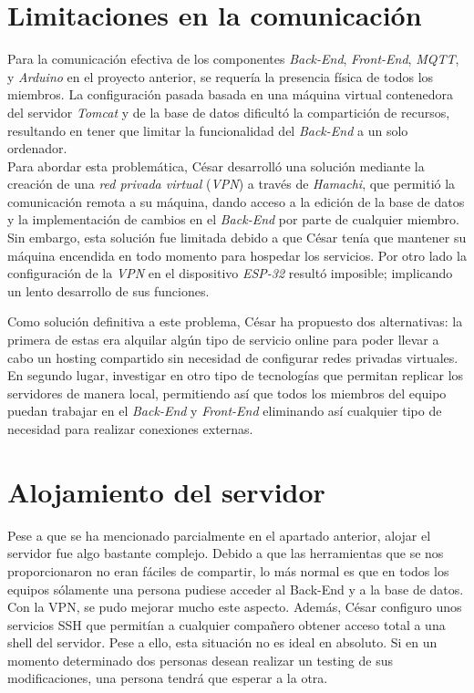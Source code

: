 \documentclass[12pt]{report}
\begin{document}
\section{Limitaciones en la comunicación}
Para la comunicación efectiva de los componentes \textit{Back-End}, \textit{Front-End}, \textit{MQTT}, y \textit{Arduino} en el proyecto anterior, se requería la presencia física de todos los miembros. La configuración pasada basada en una máquina virtual contenedora del servidor \textit{Tomcat} y de la base de datos dificultó la compartición de recursos, resultando en tener que limitar la funcionalidad del \textit{Back-End} a un solo ordenador.\\
Para abordar esta problemática, César desarrolló una solución mediante la creación de una \textit{red privada virtual} (\textit{VPN}) a través de \textit{Hamachi}, que permitió la comunicación remota a su máquina, dando acceso a la edición de la base de datos y la implementación de cambios en el \textit{Back-End} por parte de cualquier miembro. Sin embargo, esta solución fue limitada debido a que César tenía que mantener su máquina encendida en todo momento para hospedar los servicios. Por otro lado la configuración de la \textit{VPN} en el dispositivo \textit{ESP-32} resultó imposible; implicando un lento desarrollo de sus funciones.

Como solución definitiva a este problema, César ha propuesto dos alternativas: la primera de estas era alquilar algún tipo de servicio online para poder llevar a cabo un hosting compartido sin necesidad de configurar redes privadas virtuales. En segundo lugar, investigar en otro tipo de tecnologías que permitan replicar los servidores de manera local, permitiendo así que todos los miembros del equipo puedan trabajar en el \textit{Back-End} y \textit{Front-End} eliminando así cualquier tipo de necesidad para realizar conexiones externas.
\section{Alojamiento del servidor}
Pese a que se ha mencionado parcialmente en el apartado anterior, alojar el servidor fue algo bastante complejo. Debido a que las herramientas que se nos proporcionaron no eran fáciles de compartir, lo más normal es que en todos los equipos sólamente una persona pudiese acceder al Back-End y a la base de datos. Con la VPN, se pudo mejorar mucho este aspecto. Además, César configuro unos servicios SSH que permitían a cualquier compañero obtener acceso total a una shell del servidor. Pese a ello, esta situación no es ideal en absoluto. Si en un momento determinado dos personas desean realizar un testing de sus modificaciones, una persona tendrá que esperar a la otra.
\end{document}
